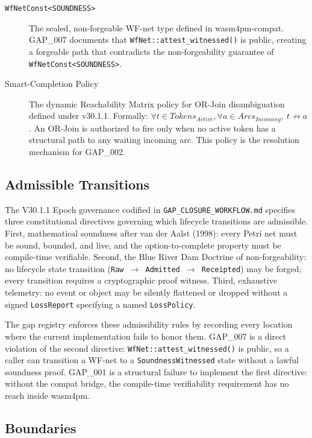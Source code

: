 \begin{description}
  \item[\texttt{WfNetConst<SOUNDNESS>}] The sealed, non-forgeable WF-net type defined in
        wasm4pm-compat. GAP\_007 documents that \texttt{WfNet::attest\_witnessed()} is
        public, creating a forgeable path that contradicts the non-forgeability guarantee
        of \texttt{WfNetConst<SOUNDNESS>}.

  \item[Smart-Completion Policy] The dynamic Reachability Matrix policy for OR-Join
        disambiguation defined under v30.1.1. Formally: $\forall t \in Tokens_{Active},
        \forall a \in Arcs_{Incoming},\ t \not\to a$. An OR-Join is authorized to fire
        only when no active token has a structural path to any waiting incoming arc.
        This policy is the resolution mechanism for GAP\_002.
\end{description}

\subsection{Admissible Transitions}
\label{sec:gaps-architecture-transitions}

The V30.1.1 Epoch governance codified in \texttt{GAP\_CLOSURE\_WORKFLOW.md} specifies
three constitutional directives governing which lifecycle transitions are admissible.
First, mathematical soundness after van der Aalst (1998): every Petri net must be sound,
bounded, and live, and the option-to-complete property must be compile-time verifiable.
Second, the Blue River Dam Doctrine of non-forgeability: no lifecycle state transition
(\texttt{Raw $\rightarrow$ Admitted $\rightarrow$ Receipted}) may be forged; every
transition requires a cryptographic proof witness. Third, exhaustive telemetry: no event
or object may be silently flattened or dropped without a signed \texttt{LossReport}
specifying a named \texttt{LossPolicy}.

The gap registry enforces these admissibility rules by recording every location where
the current implementation fails to honor them. GAP\_007 is a direct violation of the
second directive: \texttt{WfNet::attest\_witnessed()} is public, so a caller can
transition a WF-net to a \texttt{SoundnessWitnessed} state without a lawful soundness
proof. GAP\_001 is a structural failure to implement the first directive: without the
compat bridge, the compile-time verifiability requirement has no reach inside wasm4pm.

\subsection{Boundaries}
\label{sec:gaps-architecture-boundaries}

